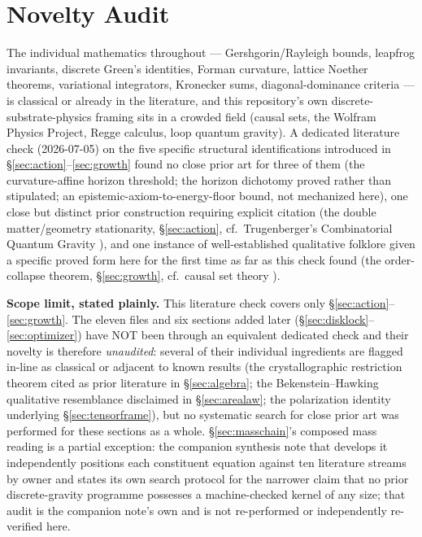 \documentclass[10pt,twocolumn]{article}
\begin{document}
\section{Novelty Audit}
\label{sec:novelty}
The individual mathematics throughout --- Gershgorin/Rayleigh bounds, leapfrog
invariants, discrete Green's identities, Forman curvature, lattice Noether
theorems, variational integrators, Kronecker sums, diagonal-dominance criteria ---
is classical or already in the literature, and this repository's own discrete-
substrate-physics framing sits in a crowded field (causal sets, the Wolfram
Physics Project, Regge calculus, loop quantum gravity). A dedicated literature
check (2026-07-05) on the five specific structural identifications introduced in
\S\ref{sec:action}--\ref{sec:growth} found no close prior art for three of them
(the curvature-affine horizon threshold; the horizon dichotomy proved rather than
stipulated; an epistemic-axiom-to-energy-floor bound, not mechanized here), one
close but distinct prior construction requiring explicit citation (the double
matter/geometry stationarity, \S\ref{sec:action}, cf.\ Trugenberger's
Combinatorial Quantum Gravity \cite{trugenberger2017}), and one instance of
well-established qualitative folklore given a specific proved form here for the
first time as far as this check found (the order-collapse theorem,
\S\ref{sec:growth}, cf.\ causal set theory \cite{surya2019}).

\textbf{Scope limit, stated plainly.} This literature check covers only
\S\ref{sec:action}--\ref{sec:growth}. The eleven files and six sections added
later (\S\ref{sec:disklock}--\ref{sec:optimizer}) have NOT been through an
equivalent dedicated check and their novelty is therefore \emph{unaudited}:
several of their individual ingredients are flagged in-line as classical or
adjacent to known results (the crystallographic restriction theorem cited as
prior literature in \S\ref{sec:algebra}; the Bekenstein--Hawking qualitative
resemblance disclaimed in \S\ref{sec:arealaw}; the polarization identity
underlying \S\ref{sec:tensorframe}), but no systematic search for close prior
art was performed for these sections as a whole. \S\ref{sec:masschain}'s
composed mass reading is a partial exception: the companion synthesis note
that develops it independently positions each constituent equation against
ten literature streams by owner and states its own search protocol for the
narrower claim that no prior discrete-gravity programme possesses a
machine-checked kernel of any size; that audit is the companion note's own
and is not re-performed or independently re-verified here.
\end{document}
